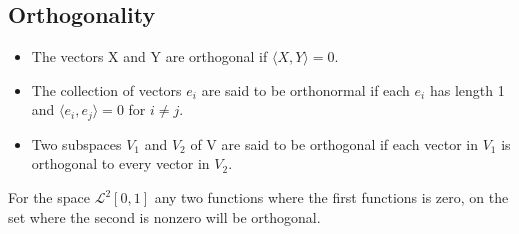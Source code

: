 \subsection{Orthogonality}
\label{subsec:Orthogonality}
\begin{defn}[Orthogonality]
    \begin{itemize}
      \item The vectors X and Y are orthogonal if $ \langle X , Y \rangle = 0 $. 
      \item The collection of vectors $ e_i $ are said to be orthonormal if each $ e_i $
          has length 1 and $ \langle e_i , e_j \rangle = 0 $ for $ i \neq j $.
      \item Two subspaces $ V_1  $ and $ V_2 $ of V are said to be orthogonal if each
          vector in $ V_1  $ is orthogonal to every vector in $ V_2 $. 
    \end{itemize}
    \label{def:Orthogonality}
\end{defn}
\begin{exmp}[]
    For the space $ \mathscr{L}^2[0,1] $ any two functions where the first functions is
    zero, on the set where the second is nonzero will be orthogonal.  
\end{exmp}


